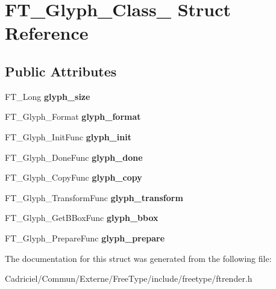 \hypertarget{struct_f_t___glyph___class__}{\section{F\-T\-\_\-\-Glyph\-\_\-\-Class\-\_\- Struct Reference}
\label{struct_f_t___glyph___class__}
}
\subsection*{Public Attributes}
\begin{DoxyCompactItemize}
\item 
\hypertarget{struct_f_t___glyph___class___a1a76c68b9fb0e93947e888c0fe77cbf8}{F\-T\-\_\-\-Long {\bfseries glyph\-\_\-size}}\label{struct_f_t___glyph___class___a1a76c68b9fb0e93947e888c0fe77cbf8}

\item 
\hypertarget{struct_f_t___glyph___class___a26738bd14d5845e18d09ccaa3a709d23}{F\-T\-\_\-\-Glyph\-\_\-\-Format {\bfseries glyph\-\_\-format}}\label{struct_f_t___glyph___class___a26738bd14d5845e18d09ccaa3a709d23}

\item 
\hypertarget{struct_f_t___glyph___class___a657200ad15ff061b38fb25b168737f95}{F\-T\-\_\-\-Glyph\-\_\-\-Init\-Func {\bfseries glyph\-\_\-init}}\label{struct_f_t___glyph___class___a657200ad15ff061b38fb25b168737f95}

\item 
\hypertarget{struct_f_t___glyph___class___aabf05a4368dccacf45e1a54e542e5d63}{F\-T\-\_\-\-Glyph\-\_\-\-Done\-Func {\bfseries glyph\-\_\-done}}\label{struct_f_t___glyph___class___aabf05a4368dccacf45e1a54e542e5d63}

\item 
\hypertarget{struct_f_t___glyph___class___afc78dcdc4802760ebcaccf3a7b6cd088}{F\-T\-\_\-\-Glyph\-\_\-\-Copy\-Func {\bfseries glyph\-\_\-copy}}\label{struct_f_t___glyph___class___afc78dcdc4802760ebcaccf3a7b6cd088}

\item 
\hypertarget{struct_f_t___glyph___class___a5f72ac1d0d92eb31fa3e2bb721a97ef2}{F\-T\-\_\-\-Glyph\-\_\-\-Transform\-Func {\bfseries glyph\-\_\-transform}}\label{struct_f_t___glyph___class___a5f72ac1d0d92eb31fa3e2bb721a97ef2}

\item 
\hypertarget{struct_f_t___glyph___class___a06bfad431865c6731305cb781f78b317}{F\-T\-\_\-\-Glyph\-\_\-\-Get\-B\-Box\-Func {\bfseries glyph\-\_\-bbox}}\label{struct_f_t___glyph___class___a06bfad431865c6731305cb781f78b317}

\item 
\hypertarget{struct_f_t___glyph___class___af7f406e5ea20a6614c946746938830c9}{F\-T\-\_\-\-Glyph\-\_\-\-Prepare\-Func {\bfseries glyph\-\_\-prepare}}\label{struct_f_t___glyph___class___af7f406e5ea20a6614c946746938830c9}

\end{DoxyCompactItemize}


The documentation for this struct was generated from the following file\-:\begin{DoxyCompactItemize}
\item 
Cadriciel/\-Commun/\-Externe/\-Free\-Type/include/freetype/ftrender.\-h\end{DoxyCompactItemize}

